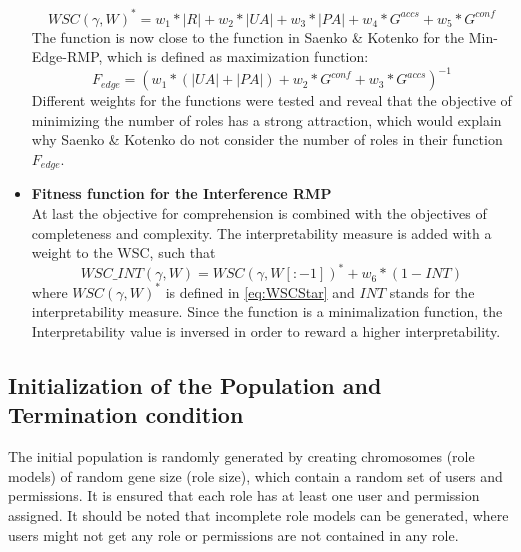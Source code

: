 \begin{itemize}
            \begin{equation}\label{eq:WSCStar}
                WSC(\gamma,W)^* = w_1 * |R| + w_2 * |UA| + w_3 * |PA| + w_4 * G^{accs} + w_5 * G^{conf}
            \end{equation}
            The function is now close to the function in Saenko \& Kotenko\cite{Igor} for the Min-Edge-RMP, which is defined as maximization function:
            \begin{equation}
                F_{edge} = (w_1 * (|UA| + |PA|) + w_2 * G^{conf} + w_3 * G^{accs})^{-1}
            \end{equation}
            Different weights for the functions were tested and reveal that the objective of minimizing the number of roles has a strong attraction, which would explain why Saenko \& Kotenko do not consider the number of roles in their function $F_{edge}$.
            \item \textbf{Fitness function for the Interference RMP}\\
            At last the objective for comprehension is combined with the objectives of completeness and complexity. The interpretability measure is added with a weight to the WSC, such that
            \begin{equation}
                WSC\_INT(\gamma,W) = WSC(\gamma,W[:-1])^* + w_6 * (1-INT)
            \end{equation}
            where $WSC(\gamma,W)^*$ is defined in \eqref{eq:WSCStar} and $INT$ stands for the interpretability measure. Since the function is a minimalization function, the Interpretability value is inversed in order to reward a higher interpretability.
        \end{itemize}
    
    \subsection{Initialization of the Population and Termination condition}
    The initial population is randomly generated by creating chromosomes (role models) of random gene size (role size), which contain a random set of users and permissions. It is ensured that each role has at least one user and permission assigned. It should be noted that incomplete role models can be generated, where users might not get any role or permissions are not contained in any role.
    
